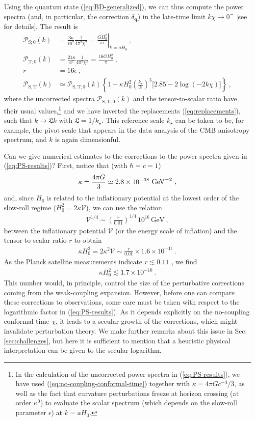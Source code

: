 \documentclass[12pt]{iopart}
\def\eq#1{\begin{equation}\begin{aligned}#1\end{aligned}\end{equation}}
\def\eref#1{(\ref{eq:#1})}
\def\q{\mathbf{q}}
\begin{document}
Using the quantum state \eref{BD-generalized}, we can thus compute the power spectra (and, in particular, the correction $\delta_{\q}$) in the late-time limit $k\chi\to0^-$ [see \citet{Chataignier:2020fap} for details]. The result is
\eq{\label{eq:PS-results}
\mathcal{P}_{\mathrm{S};0}(k) &= \frac{3\kappa}{\epsilon a^2}\frac{1}{4\pi^2\chi^2} = \left.\frac{GH_0^2}{\pi\epsilon}\right|_{k = aH_0} \ ,\\
\mathcal{P}_{\mathrm{T};0}(k) &=  \frac{24\kappa}{a^2}\frac{1}{4\pi^2\chi^2} = \frac{16GH_0^2}{\pi} \ ,\\
r &=16\epsilon \ ,\\
\mathcal{P}_{\mathrm{S,T}}(k) 
&\simeq\mathcal{P}_{\mathrm{S,T};0}(k) \left\{1 + \kappa H_0^2\left(\frac{k_{\star}}{k}\right)^3\bigl[2.85-2\log(-2k\chi)\bigr]\right\} \ ,
}
where the uncorrected spectra $\mathcal{P}_{\mathrm{S,T};0}(k)$ and the tensor-to-scalar ratio have their usual values,\footnote{In the calculation of the uncorrected power spectra in \eref{PS-results}, we have used \eref{no-coupling-conformal-time} together with $\kappa = 4\pi G c^{-4}/3$, as well as the fact that curvature perturbations freeze at horizon crossing (at order $\kappa^0$) to  evaluate the scalar spectrum (which depends on the slow-roll parameter $\epsilon$) at $k = aH_0$.} and we have inverted the replacements \eref{replacements}, such that $k\to\mathfrak{L}k$ with $\mathfrak{L} = 1/k_{\star}$. This reference scale $k_{\star}$ can be taken to be, for example, the pivot scale that appears in the data analysis of the CMB anisotropy spectrum, and $k$ is again dimensionful.

Can we give numerical estimates to the corrections to the power spectra given in \eref{PS-results}? First, notice that (with $\hbar=c=1$)
\eq{\label{eq:kappa-dim}
\kappa = \frac{4\pi G}{3} \simeq 2.8 \times 10^{-38}\ {\rm GeV}^{-2} \ ,
}
and, since $H_0$ is related to the inflationary potential at the lowest order of the slow-roll regime ($H_0^2 = 2\kappa\mathcal{V}$), we can use the relation \citep{CMBPolStudyTeam:2008rgp}
\eq{
\mathcal{V}^{1/4} \sim \left(\frac{r}{0.01}\right)^{1/4}\,10^{16}\,\text{GeV}\ ,
}
between the inflationary potential $\mathcal{V}$ (or the energy scale of inflation) and the tensor-to-scalar ratio $r$ to obtain
\eq{
\kappa H_0^2 = 2\kappa^2\mathcal{V} \sim \frac{r}{0.01}\times 1.6\times10^{-11} \ . 
}
As the Planck satellite measurements indicate $r \lesssim 0.11$ \citep{Planck2016}, we find
\eq{\label{eq:upper-bound}
\kappa H_0^2 \lesssim 1.7\times 10^{-10} \ .
}
This number would, in principle, control the size of the perturbative corrections coming from the weak-coupling expansion. However, before one can compare these corrections to observations, some care must be taken with respect to the logarithmic factor in \eref{PS-results}. As it depends explicitly on the no-coupling conformal time $\chi$, it leads to a secular growth of the corrections, which might invalidate perturbation theory. We make further remarks about this issue in Sec. \ref{sec:challenges}, but here it is sufficient to mention that a heuristic physical interpretation can be given to the secular logarithm.
\end{document}

